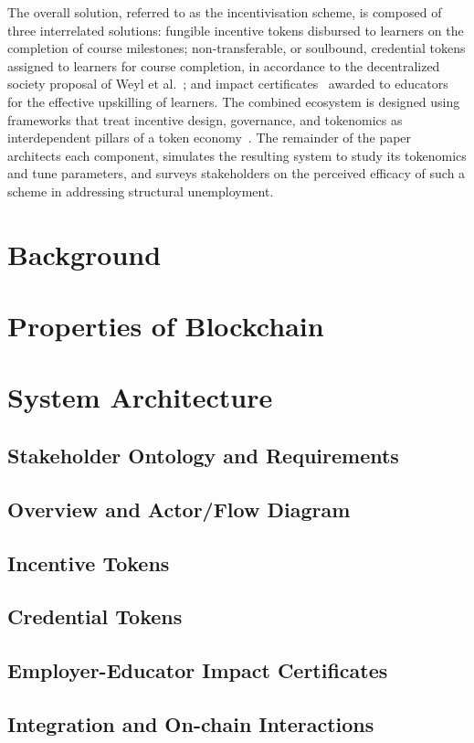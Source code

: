 \documentclass[conference]{IEEEtran}
\begin{document}
The overall solution, referred to as the incentivisation scheme, is composed of three interrelated solutions: fungible incentive tokens disbursed to learners on the completion of course milestones; non-transferable, or soulbound, credential tokens assigned to learners for course completion, in accordance to the decentralized society proposal of Weyl et al.~\cite{weyl2022decentralized}; and impact certificates~\cite{dalrymple2022hypercerts} awarded to educators for the effective upskilling of learners. The combined ecosystem is designed using frameworks that treat incentive design, governance, and tokenomics as interdependent pillars of a token economy~\cite{oliveira2018token,kivilo2026designing,sadykhov2023detect}. The remainder of the paper architects each component, simulates the resulting system to study its tokenomics and tune parameters, and surveys stakeholders on the perceived efficacy of such a scheme in addressing structural unemployment.

\section{Background}
\section{Properties of Blockchain}
\section{System Architecture}
\subsection{Stakeholder Ontology and Requirements}
\subsection{Overview and Actor/Flow Diagram}
\subsection{Incentive Tokens}
\subsection{Credential Tokens}
\subsection{Employer-Educator Impact Certificates}
\subsection{Integration and On-chain Interactions}
\end{document}
